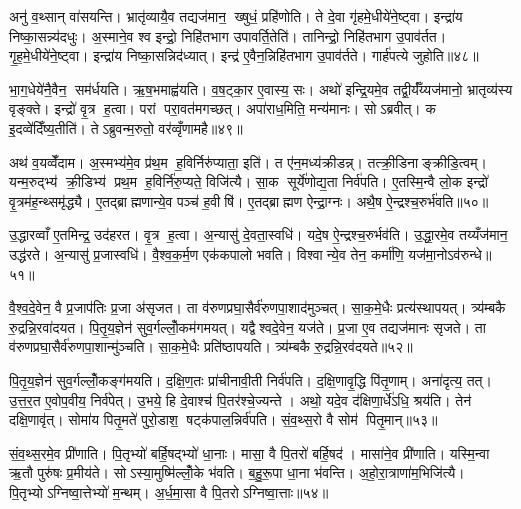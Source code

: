 अनु॑ व॒थ्सान् वा॑सयन्ति। भ्रातृ॑व्यायै॒व तद्यज॑मान॒ ख्षुधं॒ प्रहि॑णोति। ते दे॒वा गृ॑हमे॒धीये॑ने॒ष्ट्वा। इन्द्रा॑य निष्का॒सन्न्य॑दधुः। अ॒स्माने॒व श्व इन्द्रो॒ निहि॑तभाग उपावर्ति॒तेति॑। तानिन्द्रो॒ निहि॑तभाग उ॒पाव॑र्तत। गृ॒ह॒मे॒धीये॑ने॒ष्ट्वा। इन्द्रा॑य निष्का॒सन्निद॑ध्यात्। इन्द्र॑ ए॒वैन॒न्निहि॑तभाग उ॒पाव॑र्तते। गार्\mbox{}ह॑पत्ये जुहोति॥४८॥

भा॒ग॒धेये॑नै॒वैन॒ सम॑र्धयति। ऋ॒ष॒भमाह्व॑यति। व॒ष॒ट्का॒र ए॒वास्य॒ सः। अथो॑ इन्द्रि॒यमे॒व तद्वी॒र्यँ॑य्यज॑मानो॒ भ्रातृव्य॑स्य वृङ्क्ते। इन्द्रो॑ वृ॒त्र ह॒त्वा। परां परा॒वत॑मगच्छत्। अपा॑राध॒मिति॒ मन्य॑मानः। सोऽब्रवीत्। क इ॒दव्वे॑दिँष्य॒तीति॑। तेऽब्रुवन्म॒रुतो॒ वर॑व्वृँणामहै॥४९॥

अथ॑ व॒यव्वेँ॑दाम। अ॒स्मभ्य॑मे॒व प्र॑थ॒म ह॒विर्निरु॑प्याता॒ इति॑। त ए॑न॒मध्य॑क्रीडन्न्। तत्क्री॒डिनाङ्क्रीडि॒त्वम्। यन्म॒रुद्भ्य॑ क्री॒डिभ्य॑ प्रथ॒म ह॒विर्नि॑रु॒प्यते॒ विजि॑त्यै। सा॒क सूर्ये॑णोद्य॒ता निर्व॑पति। ए॒तस्मि॒न्वै लो॒क इन्द्रो॑ वृ॒त्रम॑ह॒न्थ्समृ॑द्ध्यै। ए॒तद्ब्राह्मणान्ये॒व पञ्च॑ ह॒वीषि॑। ए॒तद्ब्राह्मण ऐन्द्रा॒ग्नः। अथै॒ष ऐ॒न्द्रश्च॒रुर्भ॑वति॥५०॥

उ॒द्धारव्वाँ ए॒तमिन्द्र॒ उद॑हरत। वृ॒त्र ह॒त्वा। अ॒न्यासु॑ दे॒वता॒स्वधि॑। यदे॒ष ऐ॒न्द्रश्च॒रुर्भव॑ति। उ॒द्धा॒रमे॒व तय्यँज॑मान॒ उद्ध॑रते। अ॒न्यासु॑ प्र॒जास्वधि॑। वै॒श्व॒क॒र्म॒ण एक॑कपालो भवति। विश्वान्ये॒व तेन॒ कर्मा॑णि॒ यज॑मा॒नोऽव॑रुन्धे॥५१॥\anuvakamend[ऋ॒द्ध्य॒ते॒ऽभ्य॑ञ्जते जुहोति वृणामहै भवत्य॒ष्टौ च॑]

वै॒श्व॒दे॒वेन॒ वै प्र॒जाप॑तिः प्र॒जा अ॑सृजत। ता व॑रुणप्रघा॒सैर्व॑रुणपा॒शाद॑मुञ्चत्। सा॒क॒मे॒धैः प्रत्य॑स्थापयत्। त्र्य॑म्बकै रु॒द्रन्नि॒रवा॑दयत। पि॒तृ॒य॒ज्ञेन॑ सुव॒र्गल्लोँ॒कम॑गमयत्। यद्वैश्वदे॒वेन॒ यज॑ते। प्र॒जा ए॒व तद्यज॑मानः सृजते। ता व॑रुणप्रघा॒सैर्व॑रुणपा॒शान्मु॑ञ्चति। सा॒क॒मे॒धैः प्रति॑ष्ठापयति। त्र्य॑म्बकै रु॒द्रन्नि॒रव॑दयते॥५२॥

पि॒तृ॒य॒ज्ञेन॑ सुव॒र्गल्लोँ॒कङ्ग॑मयति। द॒क्षि॒ण॒तः प्रा॑चीनावी॒ती निर्व॑पति। द॒क्षि॒णावृ॒द्धि पि॑तृ॒णाम्। अना॑दृत्य॒ तत्। उ॒त्त॒र॒त ए॒वोप॒वीय॒ निर्व॑पेत्। उ॒भये॒ हि दे॒वाश्च॑ पि॒तर॑श्चे॒ज्यन्ते। अथो॒ यदे॒व द॑क्षिणा॒र्धे॑ऽधि॒ श्रय॑ति। तेन॑ दक्षि॒णावृ॑त्। सोमा॑य पितृ॒मते॑ पुरो॒डाश॒ षट्क॑पाल॒न्निर्व॑पति। सं॒व॒थ्स॒रो वै सोम॑ पितृ॒मान्॥५३॥

सं॒व॒थ्स॒रमे॒व प्री॑णाति। पि॒तृभ्यो॑ बर्\mbox{}हि॒षद्भ्यो॑ धा॒नाः। मासा॒ वै पि॒तरो॑ बर्\mbox{}हि॒षद॑। मासा॑ने॒व प्री॑णाति। यस्मि॒न्वा ऋ॒तौ पुरु॑षः प्र॒मीय॑ते। सोऽस्या॒मुष्मि॑ल्लोँ॒के भ॑वति। ब॒हु॒रू॒पा धा॒ना भ॑वन्ति। अ॒हो॒रा॒त्राणा॑म॒भिजि॑त्यै। पि॒तृभ्योऽग्निष्वा॒त्तेभ्यो॑ म॒न्थम्। अ॒र्ध॒मा॒सा वै पि॒तरोऽग्निष्वा॒त्ताः॥५४॥

